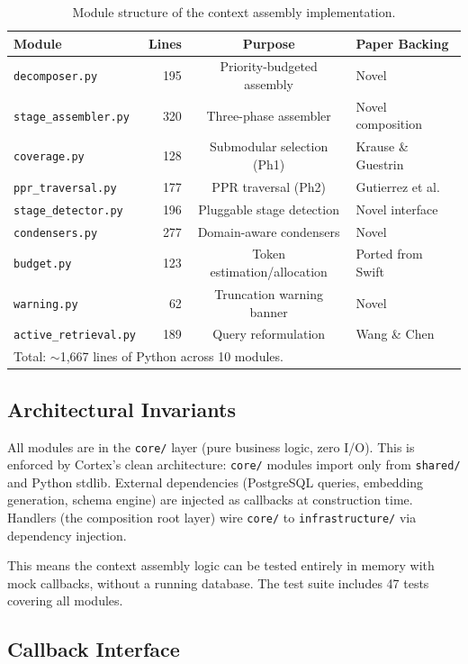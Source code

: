 \documentclass[11pt]{article}
\begin{document}
\begin{table}[h]
\centering
\caption{Module structure of the context assembly implementation.}
\label{tab:modules}
\small
\begin{tabular}{lrcl}
\toprule
Module & Lines & Purpose & Paper Backing \\
\midrule
\texttt{decomposer.py} & 195 & Priority-budgeted assembly & Novel \\
\texttt{stage\_assembler.py} & 320 & Three-phase assembler & Novel composition \\
\texttt{coverage.py} & 128 & Submodular selection (Ph1) & Krause \& Guestrin \\
\texttt{ppr\_traversal.py} & 177 & PPR traversal (Ph2) & Gutierrez et al. \\
\texttt{stage\_detector.py} & 196 & Pluggable stage detection & Novel interface \\
\texttt{condensers.py} & 277 & Domain-aware condensers & Novel \\
\texttt{budget.py} & 123 & Token estimation/allocation & Ported from Swift \\
\texttt{warning.py} & 62 & Truncation warning banner & Novel \\
\texttt{active\_retrieval.py} & 189 & Query reformulation & Wang \& Chen \\
\bottomrule
\multicolumn{4}{l}{\footnotesize Total: $\sim$1,667 lines of Python across 10 modules.} \\
\end{tabular}
\end{table}

\subsection{Architectural Invariants}

All modules are in the \texttt{core/} layer (pure business logic, zero
I/O).  This is enforced by Cortex's clean architecture:
\texttt{core/} modules import only from \texttt{shared/} and Python
stdlib.  External dependencies (PostgreSQL queries, embedding
generation, schema engine) are injected as callbacks at construction
time.  Handlers (the composition root layer) wire \texttt{core/} to
\texttt{infrastructure/} via dependency injection.

This means the context assembly logic can be tested entirely in memory
with mock callbacks, without a running database.  The test suite
includes 47 tests covering all modules.

\subsection{Callback Interface}
\end{document}
